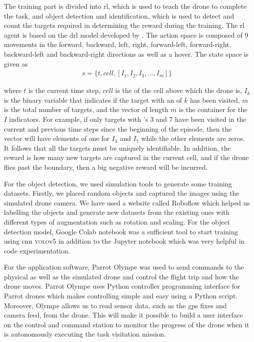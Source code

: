 \documentclass[../main.tex]{subfiles}
\begin{document}
The training part is divided into \gls{rl}, 
which is used to teach the \anafi drone to complete the task, 
and object detection and identification, 
which is used to detect and count the targets
required in determining the reward during the training. 
The \gls{rl} agent is based on the \gls{drl} model 
developed by \textcite{Ged21}. The action space is composed 
of 9 movements in the 
forward, backward, left,
right, forward-left, forward-right, backward-left and 
backward-right directions as well as a hover.
The state space is given as
\begin{align}
    s = \{ t, cell, [ I_1, I_2, I_3, \ldots, I_m] \} 
    \label{eq:state-space}
\end{align}

\noindent 
where $t$ is the current time step, $cell$ is the \id of the
cell above which the drone is, $I_k$ is the binary variable 
that indicates if the target with an \id of $k$ has been
visited, $m$ is the total number of targets,
and the vector of length $m$ is the container for the
$I$ indicators. 
For example,
if only targets with \id's 3 and 7 have been visited
in the current and previous time steps since the beginning of the 
episode,
then the vector will have elements of one for $I_3$ and $I_7$ while
the other elements are zeros.
It follows that all the targets must be uniquely identifiable.
In addition, the reward is how many new targets are captured 
in the current cell,
and if the drone flies past the boundary, then a big negative
reward will be incurred.

For the object detection, we used simulation tools to 
generate some training datasets. Firstly, 
we placed random objects and captured the images 
using the simulated drone camera. We have used a 
website called Roboflow which helped us labelling 
the objects and generate new datasets from the 
existing ones with different types of augmentation 
such as rotation and scaling. 
For the object detection model, Google Colab notebook 
was a sufficient tool to start training using 
\gls{cnn} \textsc{yolo}v5 in addition to the 
Jupyter notebook which was very helpful 
in code experimentation. 

For the application software, Parrot Olympe 
was used to send commands to the physical as well as 
the simulated drone and control the flight trip and 
how the drone moves. Parrot Olympe uses Python 
controller programming interface for Parrot drones 
which makes controlling simple and easy using a 
Python script. Moreover, Olympe allows us to read
sensor data, such as the \gls{gps} fixes and camera feed, 
from the \anafi
drone. This will make it possible to build a user interface
on the control and command station to monitor 
the progress of the drone
when it is autonomously executing the task visitation
mission.
\end{document}

